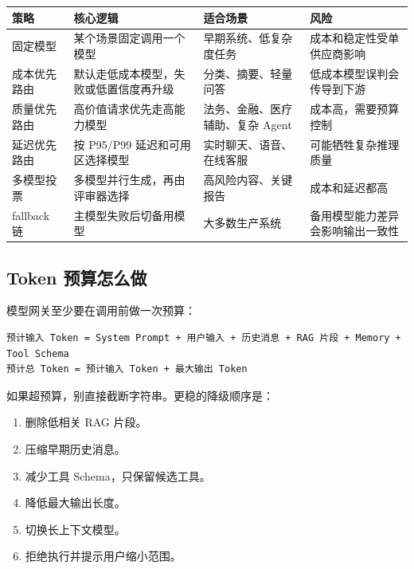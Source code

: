 \documentclass[9pt,a4paper,twocolumn]{ctexart}
\begin{document}
{\footnotesize
\begin{tabular}{|p{}|p{}|p{}|p{}|}
\hline
\textbf{策略} & \textbf{核心逻辑} & \textbf{适合场景} & \textbf{风险} \\
\hline
固定模型 & 某个场景固定调用一个模型 & 早期系统、低复杂度任务 & 成本和稳定性受单供应商影响 \\
\hline
成本优先路由 & 默认走低成本模型，失败或低置信度再升级 & 分类、摘要、轻量问答 & 低成本模型误判会传导到下游 \\
\hline
质量优先路由 & 高价值请求优先走高能力模型 & 法务、金融、医疗辅助、复杂 Agent & 成本高，需要预算控制 \\
\hline
延迟优先路由 & 按 P95/P99 延迟和可用区选择模型 & 实时聊天、语音、在线客服 & 可能牺牲复杂推理质量 \\
\hline
多模型投票 & 多模型并行生成，再由评审器选择 & 高风险内容、关键报告 & 成本和延迟都高 \\
\hline
fallback 链 & 主模型失败后切备用模型 & 大多数生产系统 & 备用模型能力差异会影响输出一致性 \\
\hline
\end{tabular}
}



\subsection*{Token 预算怎么做}


模型网关至少要在调用前做一次预算：



\begin{lstlisting}
预计输入 Token = System Prompt + 用户输入 + 历史消息 + RAG 片段 + Memory + Tool Schema
预计总 Token = 预计输入 Token + 最大输出 Token
\end{lstlisting}



如果超预算，别直接截断字符串。更稳的降级顺序是：


\begin{enumerate}[itemsep=1pt, topsep=2pt]
  \item 删除低相关 RAG 片段。
  \item 压缩早期历史消息。
  \item 减少工具 Schema，只保留候选工具。
  \item 降低最大输出长度。
  \item 切换长上下文模型。
  \item 拒绝执行并提示用户缩小范围。
\end{enumerate}
\end{document}
